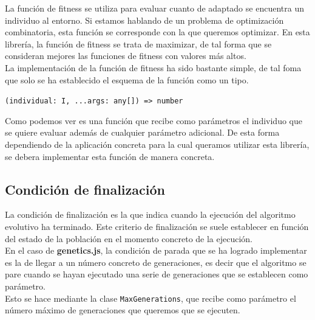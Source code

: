 La función de fitness se utiliza para evaluar cuanto de adaptado se encuentra un individuo al entorno. Si estamos hablando de un problema de optimización combinatoria, esta función se corresponde con la que queremos optimizar. En esta librería, la función de fitness se trata de maximizar, de tal forma que se consideran mejores las funciones de fitness con valores más altos.\\

La implementación de la función de fitness ha sido bastante simple, de tal foma que solo se ha establecido el esquema de la función como un tipo.

\begin{center}
    \texttt{(individual: I, ...args: any[]) => number}
\end{center}

Como podemos ver es una función que recibe como parámetros el individuo que se quiere evaluar además de cualquier parámetro adicional. De esta forma dependiendo de la aplicación concreta para la cual queramos utilizar esta librería, se debera implementar esta función de manera concreta.

\subsection{Condición de finalización}

La condición de finalización es la que indica cuando la ejecución del algoritmo evolutivo ha terminado. Este criterio de finalización se suele establecer en función del estado de la población en el momento concreto de la ejecución. \\

En el caso de \textbf{genetics.js}, la condición de parada que se ha logrado implementar es la de llegar a un número concreto de generaciones, es decir que el algoritmo se pare cuando se hayan ejecutado una serie de generaciones que se establecen como parámetro. \\

Esto se hace mediante la clase \texttt{MaxGenerations}, que recibe como parámetro el número máximo de generaciones que queremos que se ejecuten.